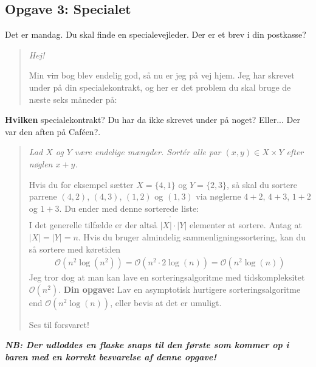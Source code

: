 \subsection{Opgave 3: Specialet}


Det er mandag.  Du skal finde en specialevejleder.  Der er et brev i din
postkasse?

\begin{quote}

{\em Hej!

Min \sout{vin} \hspace{1mm} bog blev endelig god, så nu er jeg på vej hjem.  Jeg
har skrevet under på din specialekontrakt, og her er det problem du skal bruge
de næste seks måneder på:
}

\end{quote}

\textbf{Hvilken} specialekontrakt?  Du har da ikke skrevet under på noget?
Eller...  Der var den aften på Caféen?.

\begin{quote}

{\em Lad $X$ og $Y$ være endelige mængder.  Sortér alle par
$(x, y) \in X \times Y$ efter nøglen $x + y$.

Hvis du for eksempel sætter $X = \{4, 1\}$ og $Y = \{2, 3\}$, så skal du sortere
parrene $(4, 2)$, $(4, 3)$, $(1, 2)$ og $(1, 3)$ via nøglerne $4 + 2$, $4 + 3$,
$1 + 2$ og $1 + 3$.  Du ender med denne sorterede liste:
\vspace{-1mm}
\begin{align*}
[(1, 2), (1, 3), (4, 2), (4, 3)].
\end{align*}
\vspace{-1mm}
I det generelle tilfælde er der altså $\left| X \right| \cdot \left| Y \right|$
elementer at sortere.  Antag at $\left| X \right| = \left| Y \right| = n$.  Hvis
du bruger almindelig sammenligningssortering, kan du så sortere med køretiden
\begin{align*}
  \mathcal{O}\left( n^2\log\left( n^2 \right) \right)
  = \mathcal{O}\left( n^2 \cdot 2 \log\left( n \right) \right)
  = \mathcal{O}\left( n^2 \log\left( n \right) \right)
\end{align*}
Jeg tror dog at man kan lave en sorteringsalgoritme med tidskompleksitet
$\mathcal{O}\left( n^2 \right)$.  \textbf{Din opgave:} Lav en asymptotisk
hurtigere sorteringsalgoritme end
$\mathcal{O}\left( n^2 \log\left( n \right) \right)$, eller bevis at det er
umuligt.

Ses til forsvaret!
}

\end{quote}
\vspace{-1mm}
\textbf{\emph{NB: Der udloddes en flaske snaps til den første som kommer op i
baren med en korrekt besvarelse af denne opgave!}}
